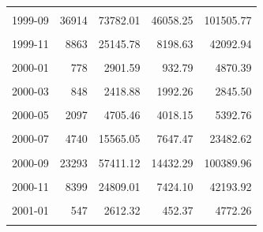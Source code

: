 \begin{longtable}[t]{crrrr}
\cellcolor{gray!10}{1999-08} & \cellcolor{gray!10}{39492} & \cellcolor{gray!10}{71822.05} & \cellcolor{gray!10}{49503.76} & \cellcolor{gray!10}{94140.34}\\
1999-09 & 36914 & 73782.01 & 46058.25 & 101505.77\\
\cellcolor{gray!10}{1999-10} & \cellcolor{gray!10}{27017} & \cellcolor{gray!10}{41964.72} & \cellcolor{gray!10}{38811.80} & \cellcolor{gray!10}{45117.64}\\
1999-11 & 8863 & 25145.78 & 8198.63 & 42092.94\\
\cellcolor{gray!10}{1999-12} & \cellcolor{gray!10}{4376} & \cellcolor{gray!10}{11780.99} & \cellcolor{gray!10}{5543.09} & \cellcolor{gray!10}{18018.88}\\
2000-01 & 778 & 2901.59 & 932.79 & 4870.39\\
\cellcolor{gray!10}{2000-02} & \cellcolor{gray!10}{562} & \cellcolor{gray!10}{2082.21} & \cellcolor{gray!10}{687.09} & \cellcolor{gray!10}{3477.33}\\
2000-03 & 848 & 2418.88 & 1992.26 & 2845.50\\
\cellcolor{gray!10}{2000-04} & \cellcolor{gray!10}{538} & \cellcolor{gray!10}{2122.29} & \cellcolor{gray!10}{1568.43} & \cellcolor{gray!10}{2676.14}\\
2000-05 & 2097 & 4705.46 & 4018.15 & 5392.76\\
\cellcolor{gray!10}{2000-06} & \cellcolor{gray!10}{6274} & \cellcolor{gray!10}{11498.02} & \cellcolor{gray!10}{8437.84} & \cellcolor{gray!10}{14558.19}\\
2000-07 & 4740 & 15565.05 & 7647.47 & 23482.62\\
\cellcolor{gray!10}{2000-08} & \cellcolor{gray!10}{22204} & \cellcolor{gray!10}{71387.54} & \cellcolor{gray!10}{46477.34} & \cellcolor{gray!10}{96297.74}\\
2000-09 & 23293 & 57411.12 & 14432.29 & 100389.96\\
\cellcolor{gray!10}{2000-10} & \cellcolor{gray!10}{27332} & \cellcolor{gray!10}{42272.46} & \cellcolor{gray!10}{39162.26} & \cellcolor{gray!10}{45382.66}\\
2000-11 & 8399 & 24809.01 & 7424.10 & 42193.92\\
\cellcolor{gray!10}{2000-12} & \cellcolor{gray!10}{4465} & \cellcolor{gray!10}{11880.39} & \cellcolor{gray!10}{5698.03} & \cellcolor{gray!10}{18062.75}\\
2001-01 & 547 & 2612.32 & 452.37 & 4772.26\\
\cellcolor{gray!10}{2001-02} & \cellcolor{gray!10}{1060} & \cellcolor{gray!10}{2368.52} & \cellcolor{gray!10}{1532.11} & \cellcolor{gray!10}{3204.94}\\

\end{longtable}
